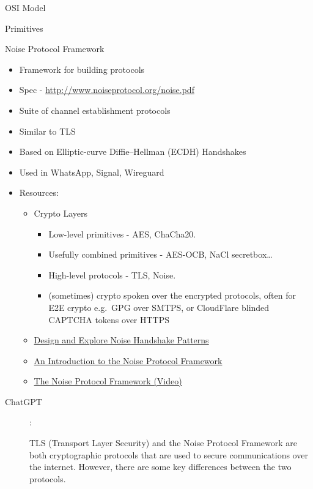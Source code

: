 \begin{frame}[fragile]{OSI Model}
\begin{block}{Primitives}
\begin{block}{Noise Protocol Framework}
\protect\hypertarget{noise-protocol-framework}{}
\begin{itemize}
\tightlist
\item
  Framework for building protocols
\item
  Spec - \url{http://www.noiseprotocol.org/noise.pdf}
\item
  Suite of channel establishment protocols
\item
  Similar to TLS
\item
  Based on Elliptic-curve Diffie--Hellman (ECDH) Handshakes
\item
  Used in WhatsApp, Signal, Wireguard
\item
  Resources:

  \begin{itemize}
  \tightlist
  \item
    Crypto Layers

    \begin{itemize}
    \tightlist
    \item
      Low-level primitives - AES, ChaCha20.
    \item
      Usefully combined primitives - AES-OCB, NaCl secretbox\ldots{}
    \item
      High-level protocols - TLS, Noise.
    \item
      (sometimes) crypto spoken over the encrypted protocols, often for
      E2E crypto e.g.~GPG over SMTPS, or CloudFlare blinded CAPTCHA
      tokens over HTTPS
    \end{itemize}
  \item
    \href{https://noiseexplorer.com/}{Design and Explore Noise Handshake
    Patterns}
  \item
    \href{https://duo.com/labs/tech-notes/noise-protocol-framework-intro}{An
    Introduction to the Noise Protocol Framework}
  \item
    \href{https://www.youtube.com/watch?v=ceGTgqypwnQ}{The Noise
    Protocol Framework (Video)}
  \end{itemize}
\end{itemize}

\begin{description}
\item[ChatGPT]
:

TLS (Transport Layer Security) and the Noise Protocol Framework are both
cryptographic protocols that are used to secure communications over the
internet. However, there are some key differences between the two
protocols.


\end{description}
\end{block}
\end{block}
\end{frame}
